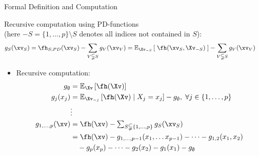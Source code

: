 \documentclass[11pt,compress,t,notes=noshow, aspectratio=169, xcolor=table]{beamer}
\newcommand{\open}{}
\newcommand{\close}{}
\begin{document}
\begin{frame}{Formal Definition and Computation
}

\begin{definition}
    Recursive computation using PD-functions \\
    (here $-S = \{1, \ldots, p \} \setminus S$ denotes all indices not contained in \(S\)):
    \begin{align*}
    g_{S}(\xv_S)
        & = \fh_{S;PD}(\xv_S) - \sum_{V \subsetneqq S} g_V(\xv_V)
        = \mathbb{E}_{\Xv_{-S}} \left[ \; \fh(\xv_S, \Xv_{-S}) \; \right] - \sum_{V \subsetneqq S} g_V(\xv_V)
    \end{align*}
\end{definition}

\begin{itemize}
    \item Recursive computation:
    \begin{align*}
        g_{\open \emptyset \close} &= \mathbb{E}_\Xv\left[\fh(\Xv)\right] \\
        g_{\open j \close}(x_j) &= \mathbb{E}_{\Xv_{-j}}\left[\fh(\Xv) \; \vert  \; X_j = x_j \right] - g_{\open \emptyset \close}, \; \forall j \in \{1, \ldots, p\} \\%
        & \vdots \\
        g_{\open 1, \dots, p \close}(\xv)
        & = \fh(\xv) -
        \textstyle\sum_{S \subsetneqq \{1,\ldots,p\}} g_{S}(\xv_S) \\
        & = \fh(\xv) -
        g_{\open 1, \dots, p-1 \close}(x_{1}, \dots x_{p-1}) - \dots - g_{\open 1, 2 \close}(x_1, x_2) \\
        & \quad - g_{\open p \close}(x_p)  - \dots - g_{\open 2 \close}(x_2) - g_{\open 1 \close}(x_1) - g_{\open \emptyset \close}
    \end{align*}

\end{itemize}
        
\end{frame}
\end{document}
